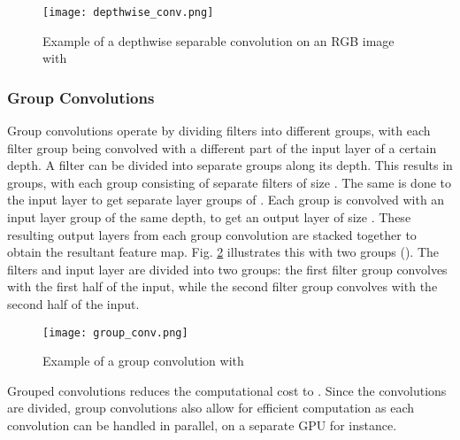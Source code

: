 \documentclass[conference]{IEEEtran}
\begin{document}
\begin{figure}[b!]
\begin{center}
\texttt{[image: depthwise\_conv.png]}
\end{center}
\caption{Example of a depthwise separable convolution on an RGB image with }
\label{fig:depthsepconv}
\end{figure}

\subsubsection{Group Convolutions}
Group convolutions \cite{krizhevsky2012imagenet} operate by dividing filters into different groups, with each filter group being convolved with a different part of the input layer of a certain depth. A filter can be divided into  separate groups along its depth. This results in  groups, with each group consisting of  separate filters of size . The same is done to the input layer to get  separate layer groups of . Each  group is convolved with an input layer group of the same depth, to get an output layer of size . These resulting output layers from each group convolution are stacked together to obtain the resultant feature map. Fig. \ref{fig:groupconv} illustrates this with two groups (). The filters and input layer are divided into two groups: the first filter group convolves with the first half of the input, while the second filter group convolves with the second half of the input.
\begin{figure}
\begin{center}
\texttt{[image: group\_conv.png]}
\end{center}
\caption{Example of a group convolution with }
\label{fig:groupconv}
\end{figure}
Grouped convolutions reduces the computational cost to . Since the convolutions are divided, group convolutions also allow for efficient computation as each convolution can be handled in parallel, on a separate GPU for instance.
\end{document}
